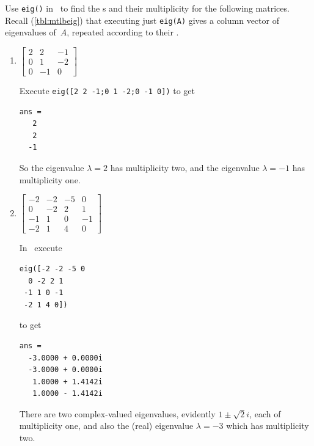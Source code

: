 \begin{example} \label{eg:multeval}
Use \verb|eig()| in \script\  to find the s and their multiplicity for the following matrices.
Recall (\autoref{tbl:mtlbeig}) that executing just \verb|eig(A)| gives a column vector of eigenvalues of~\(A\), repeated according to their . 
\begin{enumerate}
\item \(\begin{bmatrix}2&2&-1
\\0&1&-2
\\0&-1&0\end{bmatrix}\)
\begin{solution} 
Execute \verb|eig([2 2 -1;0 1 -2;0 -1 0])| to get
\setbox\ajrqrbox\hbox{}%
\marginpar{\usebox{\ajrqrbox}}%
\begin{verbatim}
ans =
   2
   2
  -1
\end{verbatim}
So the eigenvalue \(\lambda=2\) has multiplicity two, and the eigenvalue \(\lambda=-1\) has multiplicity one.
\end{solution}

\item \(\begin{bmatrix}-2&-2&-5&0
\\0&-2&2&1
\\-1&1&0&-1
\\-2&1&4&0\end{bmatrix}\)
\begin{solution} 
In \script\ execute
\begin{verbatim}
eig([-2 -2 -5 0
  0 -2 2 1
 -1 1 0 -1
 -2 1 4 0])
\end{verbatim}
\setbox\ajrqrbox\hbox{}%
\marginpar{\usebox{\ajrqrbox}}%
to get
\begin{verbatim}
ans =
  -3.0000 + 0.0000i
  -3.0000 + 0.0000i
   1.0000 + 1.4142i
   1.0000 - 1.4142i
\end{verbatim}
There are two complex-valued eigenvalues, evidently \(1\pm\sqrt2i\), each of multiplicity one, and also the (real) eigenvalue \(\lambda=-3\) which has multiplicity two.
\end{solution}


\end{enumerate}
\end{example}
